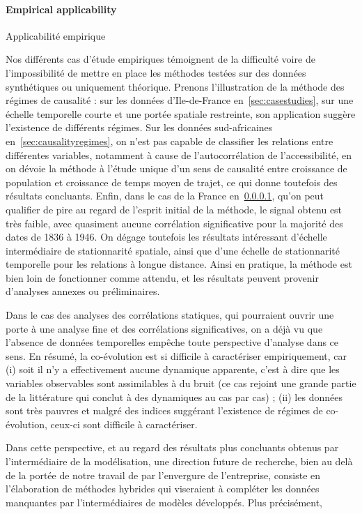 \paragraph{Empirical applicability}{Applicabilité empirique}

Nos différents cas d'étude empiriques témoignent de la difficulté voire de l'impossibilité de mettre en place les méthodes testées sur des données synthétiques ou uniquement théorique. Prenons l'illustration de la méthode des régimes de causalité : sur les données d'Ile-de-France en~\ref{sec:casestudies}, sur une échelle temporelle courte et une portée spatiale restreinte, son application suggère l'existence de différents régimes. Sur les données sud-africaines en~\ref{sec:causalityregimes}, on n'est pas capable de classifier les relations entre différentes variables, notamment à cause de l'autocorrélation de l'accessibilité, en on dévoie la méthode à l'étude unique d'un sens de causalité entre croissance de population et croissance de temps moyen de trajet, ce qui donne toutefois des résultats concluants. Enfin, dans le cas de la France en~\ref{}, qu'on peut qualifier de pire au regard de l'esprit initial de la méthode, le signal obtenu est très faible, avec quasiment aucune corrélation significative pour la majorité des dates de 1836 à 1946. On dégage toutefois les résultats intéressant d'échelle intermédiaire de stationnarité spatiale, ainsi que d'une échelle de stationnarité temporelle pour les relations à longue distance. Ainsi en pratique, la méthode est bien loin de fonctionner comme attendu, et les résultats peuvent provenir d'analyses annexes ou préliminaires.

Dans le cas des analyses des corrélations statiques, qui pourraient ouvrir une porte à une analyse fine et des corrélations significatives, on a déjà vu que l'absence de données temporelles empêche toute perspective d'analyse dans ce sens. En résumé, la co-évolution est si difficile à caractériser empiriquement, car (i) soit il n'y a effectivement aucune dynamique apparente, c'est à dire que les variables observables sont assimilables à du bruit (ce cas rejoint une grande partie de la littérature qui conclut à des dynamiques au cas par cas) ; (ii) les données sont très pauvres et malgré des indices suggérant l'existence de régimes de co-évolution, ceux-ci sont difficile à caractériser.


Dans cette perspective, et au regard des résultats plus concluants obtenus par l'intermédiaire de la modélisation, une direction future de recherche, bien au delà de la portée de notre travail de par l'envergure de l'entreprise, consiste en l'élaboration de méthodes hybrides qui viseraient à compléter les données manquantes par l'intermédiaires de modèles développés. Plus précisément, %




